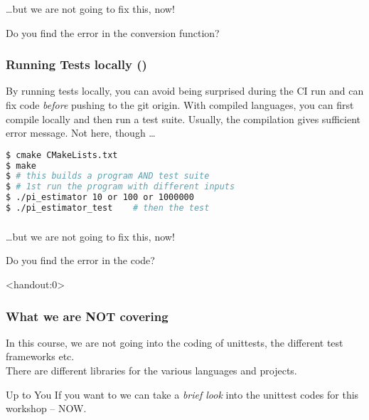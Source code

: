 \begin{frame}
	\frametitle{}
	\ldots but we are not going to fix this, now!
	\begin{question}
	  {Do you find the error in the conversion function?}
	\end{question}
\end{frame}

\begin{frame}[fragile]
	\frametitle{Running Tests locally (\CC)}
	\begin{warning}
		{By running tests locally, you can avoid being surprised during the CI run and can fix code \emph{before} pushing to the git origin. With compiled languages, you can first compile locally and then run a test suite. Usually, the compilation gives sufficient error message. Not here, though \ldots}
	\end{warning}
	\pause
	\begin{lstlisting}[language=Bash, style=Shell]
$ cmake CMakeLists.txt
$ make
$ # this builds a program AND test suite
$ # 1st run the program with different inputs
$ ./pi_estimator 10 or 100 or 1000000  
$ ./pi_estimator_test    # then the test
	\end{lstlisting}	
\end{frame}

\begin{frame}
	\frametitle{}
	\ldots but we are not going to fix this, now!
	\begin{question}
		{Do you find the error in the code?}
	\end{question}
\end{frame}

\begin{frame}<handout:0>
	\frametitle{What we are NOT covering}
	\begin{warning}[Unittests]
		{In this course, we are not going into the coding of unittests, the different test frameworks etc.\\
			There are different libraries for the various languages and projects.}
	\end{warning}
	\pause
	\begin{block}{Up to You}
		{If you want to we can take a \emph{brief look} into the unittest codes for this workshop -- NOW.}
	\end{block}	
\end{frame}
